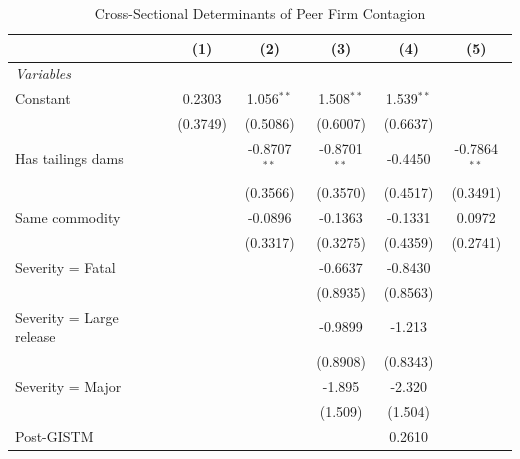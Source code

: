 \begin{table}[htbp]
   \caption{\label{tab:main_reg} Cross-Sectional Determinants of Peer Firm Contagion}
   \centering
   \begin{tabular}{lccccc}
      \tabularnewline \midrule \midrule
                                                           & (1)      & (2)            & (3)            & (4)           & (5) \\
      \midrule
      \emph{Variables}\\
      Constant                                             & 0.2303   & 1.056$^{**}$   & 1.508$^{**}$   & 1.539$^{**}$  &   \\
                                                           & (0.3749) & (0.5086)       & (0.6007)       & (0.6637)      &   \\
      Has tailings dams                                    &          & -0.8707$^{**}$ & -0.8701$^{**}$ & -0.4450       & -0.7864$^{**}$\\
                                                           &          & (0.3566)       & (0.3570)       & (0.4517)      & (0.3491)\\
      Same commodity                                       &          & -0.0896        & -0.1363        & -0.1331       & 0.0972\\
                                                           &          & (0.3317)       & (0.3275)       & (0.4359)      & (0.2741)\\
      Severity = Fatal                                     &          &                & -0.6637        & -0.8430       &   \\
                                                           &          &                & (0.8935)       & (0.8563)      &   \\
      Severity = Large release                             &          &                & -0.9899        & -1.213        &   \\
                                                           &          &                & (0.8908)       & (0.8343)      &   \\
      Severity = Major                                     &          &                & -1.895         & -2.320        &   \\
                                                           &          &                & (1.509)        & (1.504)       &   \\
      Post-GISTM                                           &          &                &                & 0.2610        &   \\

\end{tabular}
\end{table}
